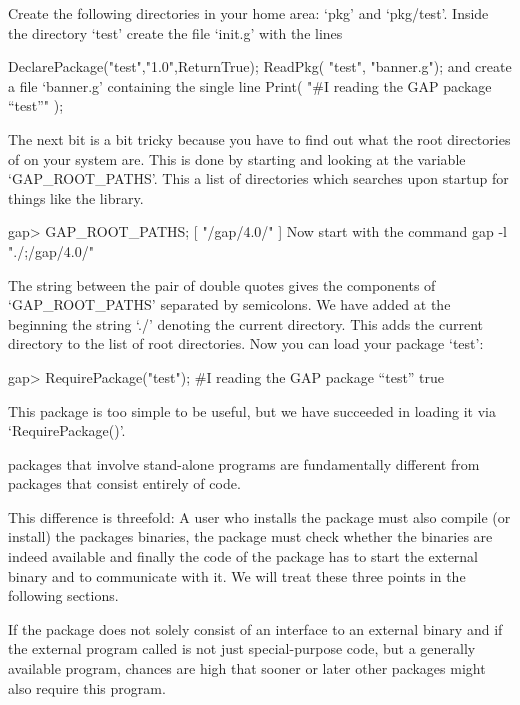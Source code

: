 Create the following  directories in your home area:  `pkg' and
`pkg/test'. Inside the directory `test' create the file `init.g' with
the lines

\begintt
DeclarePackage("test","1.0",ReturnTrue);
ReadPkg( "test", "banner.g");
\endtt
and create a file `banner.g' containing the single line
\begintt
Print( "#I reading the GAP package ``test''\n" );
\endtt

The next bit is a bit tricky because you have to find out what the
root directories of {\GAP} on your system are.  This is done by
starting {\GAP} and looking at the variable `GAP_ROOT_PATHS'. This a
list of directories which {\GAP} searches upon startup for things like
the {\GAP} library.

\begintt
gap> GAP_ROOT_PATHS;
[ "/gap/4.0/" ]
\endtt
Now start {\GAP} with the command 
\begintt
gap -l "./;/gap/4.0/"
\endtt

The string between the pair of double quotes gives the components of
`GAP_ROOT_PATHS' separated by semicolons. We have added at the beginning
the string `./' denoting the current directory. This adds the current
directory to the list of {\GAP} root directories.  Now you can load your
{\GAP} package `test':

\begintt
gap> RequirePackage("test");
#I reading the GAP package ``test''
true
\endtt

This {\GAP} package is too simple to be useful, but we have succeeded in
loading it via `RequirePackage()'.


{\GAP} packages that  involve stand-alone programs are fundamentally
different from {\GAP} packages that consist entirely of {\GAP} code.

This difference is threefold: A  user who installs the {\GAP} package
must also  compile (or install) the packages  binaries, the
package must  check whether the binaries  are indeed available and
finally the {\GAP} code of the package has to start the external
binary and to communicate with it. We will treat these three points in
the following sections.

If the package does not solely consist of an interface to an external
binary and if the external program called is not just special-purpose
code, but a generally available program, chances are high that sooner
or later other {\GAP} packages might also require this program.

